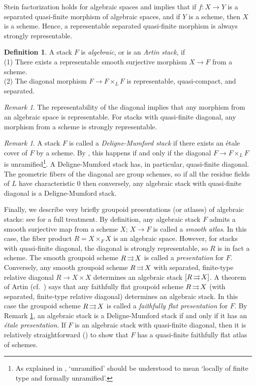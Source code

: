 \documentclass[12pt]{amsart}
\newcommand{\toto}{\operatornamewithlimits{\rightrightarrows}}
\theoremstyle{plain}
\theoremstyle{definition}
\newtheorem  {defn} [thm] {Definition}
\theoremstyle{remark}
\newtheorem {remark} [thm]  {Remark}
\begin{document}
Stein factorization holds for algebraic spaces and
implies \cite[II.6.15]{Kn}
that if $f\colon X\rightarrow Y$ is a separated quasi-finite morphism
of algebraic spaces, and if $Y$ is a scheme, then $X$ is a scheme.
Hence, a representable separated quasi-finite morphism is
always strongly representable.

\begin{defn} \label{d.algstack}
A stack $F$ is {\it algebraic}, or is an {\it Artin stack}, if \\
(1) There exists a representable smooth surjective morphism 
$X \rightarrow F$ from a scheme. \\
(2) The diagonal morphism $F \rightarrow F \times_L F$
is representable, quasi-compact, and separated.
\end{defn}

\begin{remark}
The representability of the diagonal implies
that any morphism from an algebraic space is representable.
For stacks with quasi-finite diagonal,
any morphism from a scheme is strongly representable.
\end{remark}

\begin{remark} \label{rem.dmstack}
A stack $F$ is called a {\it Deligne-Mumford stack} 
if there exists an \'etale cover of $F$ by a scheme. By \cite[8.1]{L-MB},
this happens if and only if the diagonal $F \to F \times_L F$ is
unramified\footnote{As explained in \cite[4.2]{L-MB}, `unramified' should
be understood to mean `locally of finite type and formally unramified'.}.
A Deligne-Mumford
stack has, in particular, quasi-finite diagonal.
The geometric fibers of the diagonal are group schemes,
so if all the residue fields of $L$ 
have characteristic 0 then conversely, any
algebraic stack with quasi-finite diagonal
is a Deligne-Mumford stack.
\end{remark}

Finally, we describe very briefly groupoid presentations (or atlases) of
algebraic stacks: see \cite{L-MB} for a full treatment. By definition,
any algebraic stack
$F$ admits a smooth surjective map from a scheme $X$; $X \rightarrow F$ is
called a {\em smooth atlas}.
In this case, the fiber product $R = X \times_{F} X$
is an algebraic space. However, for stacks with quasi-finite
diagonal, the diagonal is strongly representable, so
$R$ is in fact a scheme. The smooth
groupoid scheme $R \toto X$ is called a {\em presentation} for $F$.
Conversely, any smooth groupoid scheme $R \toto X$ with
separated, finite-type relative diagonal $R\to X\times X$
determines an algebraic stack $[R \toto X]$.
A theorem of  Artin (cf.\ \cite[10.1]{L-MB}) says that any
faithfully flat groupoid scheme $R \toto X$ (with separated, finite-type
relative diagonal) determines an algebraic stack. In this
case the groupoid scheme
$R \toto X$ is called a {\em faithfully flat presentation} for $F$.
By Remark \ref{rem.dmstack}, an algebraic stack
is a Deligne-Mumford stack if and only if
it has an {\em \'etale presentation}.
If $F$ is an algebraic stack with quasi-finite diagonal, then it is relatively
straightforward (\cite[Lemma 3.3]{KM}) to show that
$F$ has a quasi-finite faithfully flat atlas of schemes.
\end{document}
